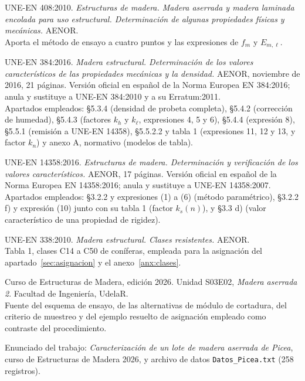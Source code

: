 \documentclass[11pt,a4paper]{article}
\newcommand{\fm}{f_{m}}
\newcommand{\Eml}{E_{m,\ell}}
\begin{document}
\begin{enumerate}[label={[\arabic*]}, leftmargin=2.2em, itemsep=0.35em]
  \item UNE-EN 408:2010. \emph{Estructuras de madera. Madera aserrada y madera laminada
        encolada para uso estructural. Determinación de algunas propiedades físicas y
        mecánicas.} AENOR. \\
        Aporta el método de ensayo a cuatro puntos y las expresiones de $\fm$ y $\Eml$.

  \item UNE-EN 384:2016. \emph{Madera estructural. Determinación de los valores
        característicos de las propiedades mecánicas y la densidad.} AENOR, noviembre
        de 2016, 21 páginas. Versión oficial en español de la Norma Europea EN
        384:2016; anula y sustituye a UNE-EN 384:2010 y a su Erratum:2011. \\
        Apartados empleados: \S5.3.4 (densidad de probeta completa), \S5.4.2
        (corrección de humedad), \S5.4.3 (factores $k_{h}$ y $k_{\ell}$, expresiones 4,
        5 y 6), \S5.4.4 (expresión 8), \S5.5.1 (remisión a UNE-EN 14358), \S5.5.2.2 y
        tabla 1 (expresiones 11, 12 y 13, y factor $k_{n}$) y anexo A, normativo
        (modelos de tabla).

  \item UNE-EN 14358:2016. \emph{Estructuras de madera. Determinación y verificación de
        los valores característicos.} AENOR, 17 páginas. Versión oficial en español de
        la Norma Europea EN 14358:2016; anula y sustituye a UNE-EN 14358:2007. \\
        Apartados empleados: \S3.2.2 y expresiones (1) a (6) (método paramétrico),
        \S3.2.2 f) y expresión (10) junto con su tabla 1 (factor $k_{s}(n)$), y \S3.3 d)
        (valor característico de una propiedad de rigidez).

  \item UNE-EN 338:2010. \emph{Madera estructural. Clases resistentes.} AENOR. \\
        Tabla 1, clases C14 a C50 de coníferas, empleada para la asignación del
        apartado~\ref{sec:asignacion} y el anexo~\ref{anx:clases}.

  \item Curso de Estructuras de Madera, edición 2026. Unidad S03E02,
        \emph{Madera aserrada 2}. Facultad de Ingeniería, UdelaR. \\
        Fuente del esquema de ensayo, de las alternativas de módulo de cortadura, del
        criterio de muestreo y del ejemplo resuelto de asignación empleado como
        contraste del procedimiento.

  \item Enunciado del trabajo: \emph{Caracterización de un lote de madera aserrada de
        Picea}, curso de Estructuras de Madera 2026, y archivo de datos
        \texttt{Datos\_Picea.txt} (258 registros).
\end{enumerate}
\end{document}
